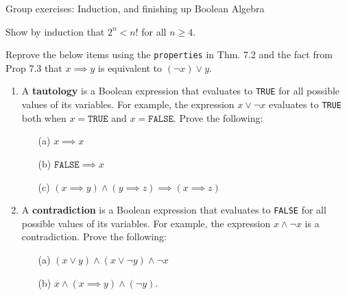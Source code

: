 \documentclass[10pt]{beamer}
\begin{document}
\begin{frame}{Group exercises: Induction, and finishing up Boolean Algebra}
\footnotesize 

\begin{mygreenbox}
Show by induction that $2^n < n!$ for all $n \geq 4$.
\end{mygreenbox}

\begin{myyellowbox}
	Reprove the below items using the \texttt{properties} in Thm. 7.2 and the fact  from Prop 7.3 that $x \implies y$ is equivalent to $(\lnot x) \lor y$. 
\begin{enumerate}
	\item A \textbf{tautology} is a Boolean expression that evaluates to \texttt{TRUE} for all possible values of its variables.  For example, the expression $x \lor \lnot x$ evaluates to \texttt{TRUE}  both when $x=\texttt{TRUE}$ and $x=\texttt{FALSE}$.  Prove the following:
		\begin{enumerate}
		\item[(a)] $x \implies x$
		\item[(b)] $\texttt{FALSE} \implies x$
		\item[(c)] $(x \implies y) \land (y \implies z) \implies (x \implies z)$ 
		\end{enumerate}
	\item  A \textbf{contradiction} is a Boolean expression that evaluates to \texttt{FALSE} for all possible values of its variables.  For example, the expression $x \land \lnot x$ is a contradiction.  Prove the following:
		\begin{enumerate}
		\item[(a)] $(x \lor y) \land (x \lor \lnot y) \land \lnot x$
		\item[(b)] $x \land (x \implies y) \land (\lnot y)$.
		\end{enumerate}
	\end{enumerate}
\end{myyellowbox}

\end{frame}
\end{document}
